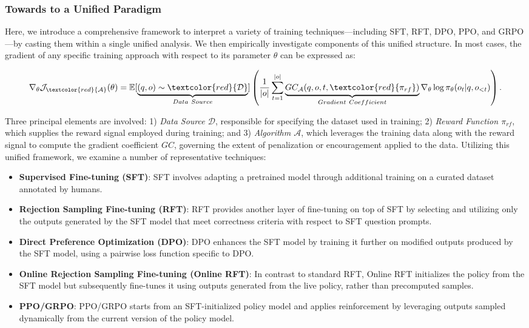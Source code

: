 \begin{itemize}[topsep=0pt]
\subsubsection{Towards to a Unified Paradigm} Here, we introduce a comprehensive framework to interpret a variety of training techniques—including SFT, RFT, DPO, PPO, and GRPO—by casting them within a single unified analysis. We then empirically investigate components of this unified structure. In most cases, the gradient of any specific training approach with respect to its parameter $\theta$ can be expressed as:

\begin{equation}
    \nabla_{\theta}\mathcal{J}_{\textcolor{red}{\mathcal{A}}}(\theta) = \mathbb{E}[\underbrace{(q,o) \sim \textcolor{red}{\mathcal{D}}}_{Data \ Source}]\left( \frac{1}{|o|} \sum_{t=1}^{|o|}  \underbrace{GC_{{\mathcal{A}}}(q, o, t, \textcolor{red}{\pi_{{rf}}})}_{Gradient \ Coefficient}  \nabla_{\theta}\log \pi_{\theta}(o_t | q, o_{<t})\right).
\label{eq:objective}
\end{equation}

Three principal elements are involved: 1) \textit{Data Source $\mathcal{D}$}, responsible for specifying the dataset used in training; 2) \textit{Reward Function $\pi_{{rf}}$}, which supplies the reward signal employed during training; and 3) \textit{Algorithm $\mathcal{A}$}, which leverages the training data along with the reward signal to compute the gradient coefficient $GC$, governing the extent of penalization or encouragement applied to the data. Utilizing this unified framework, we examine a number of representative techniques:

\begin{itemize}
    \item \textbf{Supervised Fine-tuning (SFT)}: SFT involves adapting a pretrained model through additional training on a curated dataset annotated by humans.
    \item \textbf{Rejection Sampling Fine-tuning (RFT)}: RFT provides another layer of fine-tuning on top of SFT by selecting and utilizing only the outputs generated by the SFT model that meet correctness criteria with respect to SFT question prompts.
    \item \textbf{Direct Preference Optimization (DPO)}: DPO enhances the SFT model by training it further on modified outputs produced by the SFT model, using a pairwise loss function specific to DPO.
    \item \textbf{Online Rejection Sampling Fine-tuning (Online RFT)}: In contrast to standard RFT, Online RFT initializes the policy from the SFT model but subsequently fine-tunes it using outputs generated from the live policy, rather than precomputed samples.
    \item \textbf{PPO/GRPO}: PPO/GRPO starts from an SFT-initialized policy model and applies reinforcement by leveraging outputs sampled dynamically from the current version of the policy model.
\end{itemize}


\end{itemize}
